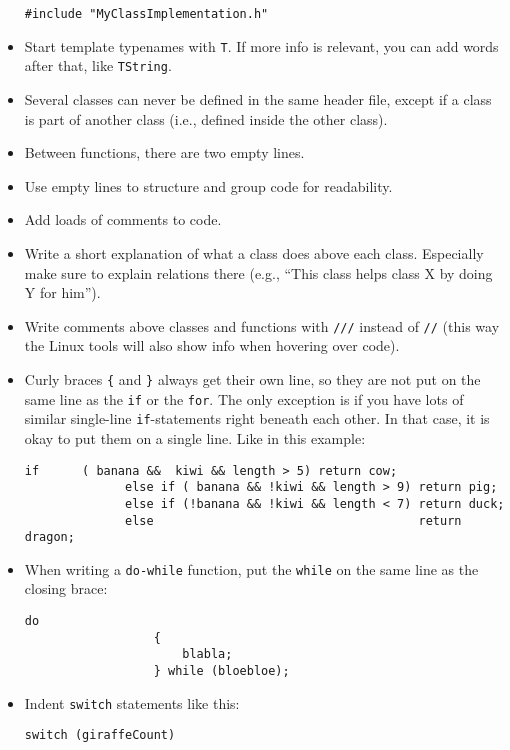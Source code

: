\documentclass{article}
\begin{document}
\begin{itemize}
\begin{Verbatim}[fontsize=\small]
              #include "MyClassImplementation.h"
          \end{Verbatim}
    \item Start template typenames with \texttt{T}. If more info is relevant, you can add words after that, like \texttt{TString}.
    \item Several classes can never be defined in the same header file, except if a class is part of another class (i.e., defined inside the other class).
    \item Between functions, there are two empty lines.
    \item Use empty lines to structure and group code for readability.
    \item Add loads of comments to code.
    \item Write a short explanation of what a class does above each class. Especially make sure to explain relations there (e.g., “This class helps class X by doing Y for him”).
    \item Write comments above classes and functions with \texttt{///} instead of \texttt{//} (this way the Linux tools will also show info when hovering over code).
    \item Curly braces \texttt{\{} and \texttt{\}} always get their own line, so they are not put on the same line as the \texttt{if} or the \texttt{for}. The only exception is if you have lots of similar single-line \texttt{if}-statements right beneath each other. In that case, it is okay to put them on a single line. Like in this example:
          \begin{Verbatim}[fontsize=\small]
              if      ( banana &&  kiwi && length > 5) return cow;
              else if ( banana && !kiwi && length > 9) return pig;
              else if (!banana && !kiwi && length < 7) return duck;
              else                                     return dragon;
          \end{Verbatim}
    \item When writing a \texttt{do-while} function, put the \texttt{while} on the same line as the closing brace:
          \begin{Verbatim}[fontsize=\small]
              do
                  {
                      blabla;
                  } while (bloebloe);
          \end{Verbatim}
    \item Indent \texttt{switch} statements like this:
          \begin{Verbatim}[fontsize=\small]
              switch (giraffeCount)

\end{Verbatim}
\end{itemize}
\end{document}
